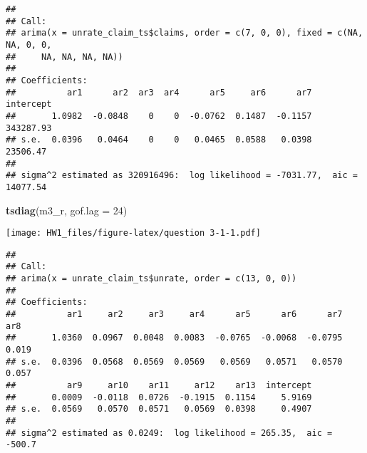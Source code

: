 \documentclass[]{article}
\newenvironment{Shaded}{\begin{snugshade}}{\end{snugshade}}
\newcommand{\KeywordTok}[1]{\textcolor[rgb]{0.13,0.29,0.53}{\textbf{#1}}}
\newcommand{\DataTypeTok}[1]{\textcolor[rgb]{0.13,0.29,0.53}{#1}}
\newcommand{\DecValTok}[1]{\textcolor[rgb]{0.00,0.00,0.81}{#1}}
\newcommand{\StringTok}[1]{\textcolor[rgb]{0.31,0.60,0.02}{#1}}
\newcommand{\OtherTok}[1]{\textcolor[rgb]{0.56,0.35,0.01}{#1}}
\newcommand{\OperatorTok}[1]{\textcolor[rgb]{0.81,0.36,0.00}{\textbf{#1}}}
\newcommand{\NormalTok}[1]{#1}
\begin{document}
\begin{verbatim}
## 
## Call:
## arima(x = unrate_claim_ts$claims, order = c(7, 0, 0), fixed = c(NA, NA, 0, 0, 
##     NA, NA, NA, NA))
## 
## Coefficients:
##          ar1      ar2  ar3  ar4      ar5     ar6      ar7  intercept
##       1.0982  -0.0848    0    0  -0.0762  0.1487  -0.1157  343287.93
## s.e.  0.0396   0.0464    0    0   0.0465  0.0588   0.0398   23506.47
## 
## sigma^2 estimated as 320916496:  log likelihood = -7031.77,  aic = 14077.54
\end{verbatim}

\begin{Shaded}
\begin{Highlighting}[]
\KeywordTok{tsdiag}\NormalTok{(m3_r, }\DataTypeTok{gof.lag =} \DecValTok{24}\NormalTok{)}
\end{Highlighting}
\end{Shaded}

\texttt{[image: HW1\_files/figure-latex/question 3-1-1.pdf]}

\begin{Shaded}
\end{Shaded}

\begin{verbatim}
## 
## Call:
## arima(x = unrate_claim_ts$unrate, order = c(13, 0, 0))
## 
## Coefficients:
##          ar1     ar2     ar3     ar4      ar5      ar6      ar7    ar8
##       1.0360  0.0967  0.0048  0.0083  -0.0765  -0.0068  -0.0795  0.019
## s.e.  0.0396  0.0568  0.0569  0.0569   0.0569   0.0571   0.0570  0.057
##          ar9     ar10    ar11     ar12    ar13  intercept
##       0.0009  -0.0118  0.0726  -0.1915  0.1154     5.9169
## s.e.  0.0569   0.0570  0.0571   0.0569  0.0398     0.4907
## 
## sigma^2 estimated as 0.0249:  log likelihood = 265.35,  aic = -500.7
\end{verbatim}

\begin{Shaded}
\end{Shaded}
\end{document}
